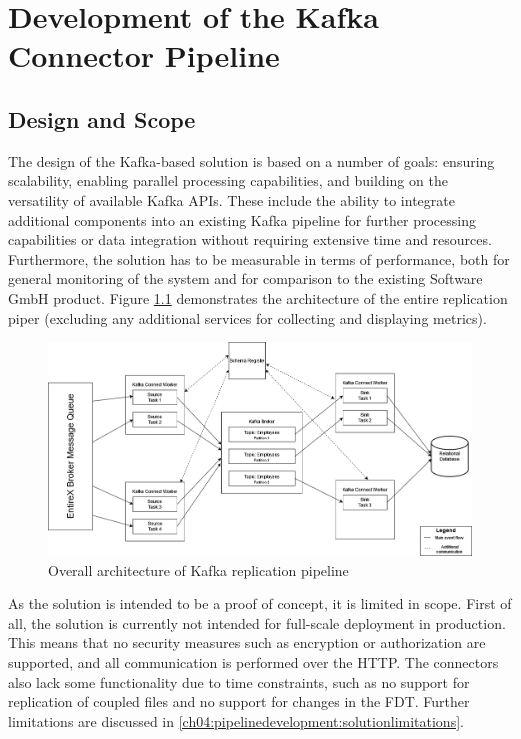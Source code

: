 \chapter{Development of the Kafka Connector Pipeline}
\label{ch04:pipelinedevelopment}

\section{Design and Scope}
The design of the Kafka-based solution is based on a number of goals: ensuring scalability, enabling parallel processing capabilities, and building on the versatility of available Kafka \ac{APIs}. These include the ability to integrate additional components into an existing Kafka pipeline for further processing capabilities or data integration without requiring extensive time and resources. Furthermore, the solution has to be measurable in terms of performance, both for general monitoring of the system and for comparison to the existing Software GmbH product. Figure \ref{fig:chapter04:overallarchitecture} demonstrates the architecture of the entire replication piper (excluding any additional services for collecting and displaying metrics).

\begin{figure}[htbp]
 \centering
 \includegraphics[width=1\textwidth]{chapters/images/kafka pipeline overall architecture.drawio.png}
 \caption{Overall architecture of Kafka replication pipeline}
 \label{fig:chapter04:overallarchitecture}
\end{figure}

As the solution is intended to be a proof of concept, it is limited in scope. First of all, the solution is currently not intended for full-scale deployment in production. This means that no security measures such as encryption or authorization are supported, and all communication is performed over the \ac{HTTP}. The connectors also lack some functionality due to time constraints, such as no support for replication of coupled files and no support for changes in the \ac{FDT}. Further limitations are discussed in \ref{ch04:pipelinedevelopment:solutionlimitations}.

